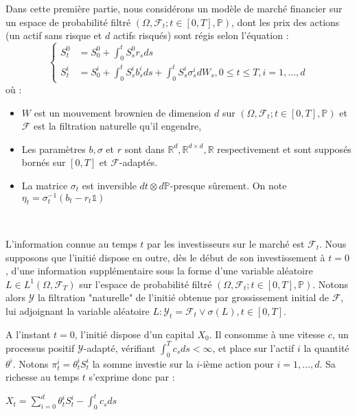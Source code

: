 \documentclass[../finalreport.tex]{subfiles}
\begin{document}
\par Dans cette première partie, nous considérons un modèle de marché financier sur un espace de probabilité filtré $(\Omega, \mathcal{F}_t; t \in [0,T], \mathbb{P})$, dont les prix des actions (un actif sans risque et $d$ actifs risqués) sont régis selon l'équation : 
\begin{equation}
\begin{cases}
S^0_t &= S_0^0 + \displaystyle \int_{0}^{t} S^0_s r_s ds \\
S_t^i &= S_0^i + \displaystyle \int_{0}^{t} S_s^i b_s^i ds +  \int_{0}^{t} S_s^i \sigma_s^i dW_s, 0\leq t \leq T, i = 1,...,d
\end{cases}
\end{equation}
où :

\begin{itemize}
\item $W$ est un mouvement brownien de dimension $d$ sur $(\Omega, \mathcal{F}_t; t \in [0,T], \mathbb{P})$ et $\mathcal{F}$ est la filtration naturelle qu'il engendre,
\item Les paramètres $b, \sigma$ et $r$ sont dans $\mathbb{R}^d, \mathbb{R}^{d\times d}, \mathbb{R}$ respectivement et sont supposés bornés sur $[0,T]$ et $\mathcal{F}$-adaptés.
\item La matrice $\sigma_t$ est inversible $dt \otimes d\mathbb{P}$-presque sûrement. On note $\eta_t = \sigma_t^{-1} \left( b_t - r_t \mathds{1} \right)$ 
\end{itemize}
\

\par L'information connue au temps $t$ par les investisseurs sur le marché est $\mathcal{F}_t$.
Nous supposons que l'initié dispose en outre, dès le début de son investissement à $t=0$, d'une information supplémentaire sous la forme d'une variable aléatoire $L \in L^1(\Omega, \mathcal{F}_T)$ sur l'espace de probabilité filtré $(\Omega, \mathcal{F}_t; t \in [0,T], \mathbb{P})$. 
Notons alors $\mathcal{Y}$ la filtration "naturelle" de l'initié obtenue par grossissement initial de $\mathcal{F}$, lui adjoignant la variable aléatoire $L : \mathcal{Y}_t = \mathcal{F}_t \vee \sigma(L), t \in [0, T]$.\\

\par A l'instant $t=0$, l'initié dispose d'un capital $X_0$. Il consomme à une vitesse $c$, un processus positif $\mathcal{Y}$-adapté, vérifiant $\int_{0}^{T} c_s ds < \infty$, et place sur l'actif $i$ la quantité $\theta^i$. Notons $\pi_t^i = \theta^i_t S_t^i$ la somme investie sur la $i$-ième action pour $i =1, ..., d$. Sa richesse au temps $t$ s'exprime donc par : 
\begin{center}
$X_t = \displaystyle \sum_{i=0}^{d} \theta^i_t S_t^i - \int_{0}^{t} c_s ds$
\end{center}
\end{document}
